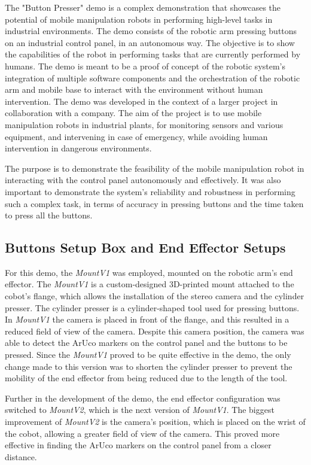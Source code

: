 The "Button Presser" demo is a complex demonstration that showcases the potential of mobile manipulation robots
in performing high-level tasks in industrial environments. The demo consists of the robotic arm pressing buttons
on an industrial control panel, in an autonomous way. The objective is to show the capabilities of the robot in performing
tasks that are currently performed by humans. The demo is meant to be a proof of concept of the robotic system's
integration of multiple software components and the orchestration of the robotic arm and mobile base to
interact with the environment without human intervention.
The demo was developed in the context of a larger project in collaboration with a company. The aim of the project is
to use mobile manipulation robots in industrial plants, for monitoring sensors and various equipment,
and intervening in case of emergency, while avoiding human intervention in dangerous environments. 

The purpose is to demonstrate the feasibility of the mobile manipulation robot in interacting with the control panel
autonomously and effectively. It was also important to demonstrate the system's reliability and robustness 
in performing such a complex task, in terms of accuracy in pressing buttons and the time taken to press all the buttons.

\subsection{Buttons Setup Box and End Effector Setups}

For this demo, the \textit{MountV1} was employed, mounted on the robotic arm's end effector. The \textit{MountV1} is a 
custom-designed 3D-printed mount attached to the cobot's flange, which allows the installation of the stereo camera and 
the cylinder presser. The cylinder presser is a cylinder-shaped tool used for pressing buttons.
In \textit{MountV1} the camera is placed in front of the flange, and this resulted in a reduced field of view of the camera.
Despite this camera position, the camera was able to detect the ArUco markers on the control panel
and the buttons to be pressed. Since the \textit{MountV1} proved to be quite effective in the demo, 
the only change made to this version was to shorten the cylinder presser to prevent
the mobility of the end effector from being reduced due to the length of the tool.

Further in the development of the demo, the end effector configuration was switched to \textit{MountV2}, 
which is the next version of \textit{MountV1}. The biggest improvement of \textit{MountV2} is the camera's position, 
which is placed on the wrist of the cobot, allowing a greater field of view of the camera. 
This proved more effective in finding the ArUco markers on the control panel from a closer distance. 

